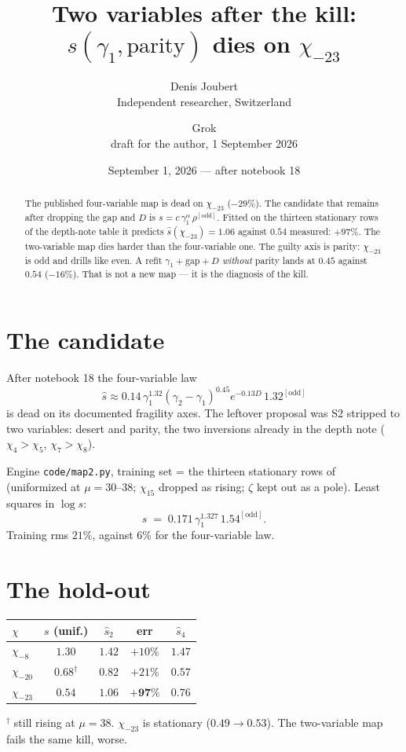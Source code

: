 \documentclass[10pt]{article}
\title{\bfseries Two variables after the kill:\\
$s(\gamma_1,\mathrm{parity})$ dies on $\chi_{-23}$}
\author{Denis Joubert\\ \small Independent researcher, Switzerland
\and Grok\\ \small draft for the author, 1 September 2026}
\date{September 1, 2026 --- after notebook 18}
\begin{document}
\maketitle
\begin{abstract}
\noindent
The published four-variable map is dead on $\chi_{-23}$ ($-29\%$).
The candidate that remains after dropping the gap and $D$ is
$s=c\,\gamma_1^\alpha\,\rho^{[\mathrm{odd}]}$. Fitted on the thirteen
stationary rows of the depth-note table it predicts $\hat s(\chi_{-23})=1.06$
against $0.54$ measured: $+97\%$. The two-variable map dies harder
than the four-variable one. The guilty axis is parity: $\chi_{-23}$ is
odd and drills like even. A refit $\gamma_1+\mathrm{gap}+D$
\emph{without} parity lands at $0.45$ against $0.54$ ($-16\%$). That
is not a new map --- it is the diagnosis of the kill.
\end{abstract}

\section{The candidate}

After notebook 18 the four-variable law
\[
\hat s \approx 0.14\,\gamma_1^{1.32}(\gamma_2-\gamma_1)^{0.45}
e^{-0.13 D}\,1.32^{[\mathrm{odd}]}
\]
is dead on its documented fragility axes. The leftover proposal was
S2 stripped to two variables: desert and parity, the two inversions
already in the depth note ($\chi_4>\chi_5$, $\chi_7>\chi_8$).

Engine \texttt{code/map2.py}, training set = the thirteen stationary
rows of~\cite{Depth} (uniformized at $\mu=30$--$38$; $\chi_{15}$
dropped as rising; $\zeta$ kept out as a pole). Least squares in
$\log s$:
\[
s \;=\; 0.171\,\gamma_1^{1.327}\,1.54^{[\mathrm{odd}]}.
\]
Training rms $21\%$, against $6\%$ for the four-variable law.

\section{The hold-out}

\begin{center}\small
\begin{tabular}{lcccc}
\toprule
$\chi$ & $s$ (unif.) & $\hat s_{2}$ & err & $\hat s_{4}$ \\
\midrule
$\chi_{-8}$  & $1.30$ & $1.42$ & $+10\%$ & $1.47$ \\
$\chi_{-20}$ & $0.68^\dagger$ & $0.82$ & $+21\%$ & $0.57$ \\
$\chi_{-23}$ & $0.54$ & $1.06$ & $\mathbf{+97\%}$ & $0.76$ \\
\bottomrule
\end{tabular}
\end{center}
$^\dagger$ still rising at $\mu=38$. $\chi_{-23}$ is stationary
($0.49\to0.53$). The two-variable map fails the same kill, worse.
\end{document}
